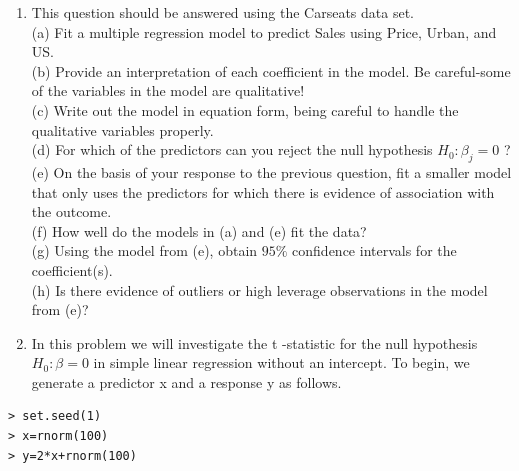 \documentclass[10pt]{article}
\begin{document}
\begin{enumerate}
(d) Use the plot() function to produce diagnostic plots of the linear regression fit. Comment on any problems you see with the fit. Do the residual plots suggest any unusually large outliers? Does the leverage plot identify any observations with unusually high leverage?\\
(e) Use the $*$ and : symbols to fit linear regression models with interaction effects. Do any interactions appear to be statistically significant?\\
(f) Try a few different transformations of the variables, such as $\log (X), \sqrt{X}, X^{2}$. Comment on your findings.
  \item This question should be answered using the Carseats data set.\\
(a) Fit a multiple regression model to predict Sales using Price, Urban, and US.\\
(b) Provide an interpretation of each coefficient in the model. Be careful-some of the variables in the model are qualitative!\\
(c) Write out the model in equation form, being careful to handle the qualitative variables properly.\\
(d) For which of the predictors can you reject the null hypothesis $H_{0}: \beta_{j}=0$ ?\\
(e) On the basis of your response to the previous question, fit a smaller model that only uses the predictors for which there is evidence of association with the outcome.\\
(f) How well do the models in (a) and (e) fit the data?\\
(g) Using the model from (e), obtain $95 \%$ confidence intervals for the coefficient(s).\\
(h) Is there evidence of outliers or high leverage observations in the model from (e)?
  \item In this problem we will investigate the t -statistic for the null hypothesis $H_{0}: \beta=0$ in simple linear regression without an intercept. To begin, we generate a predictor x and a response y as follows.
\end{enumerate}

\begin{verbatim}
> set.seed(1)
> x=rnorm(100)
> y=2*x+rnorm(100)
\end{verbatim}
\end{document}
